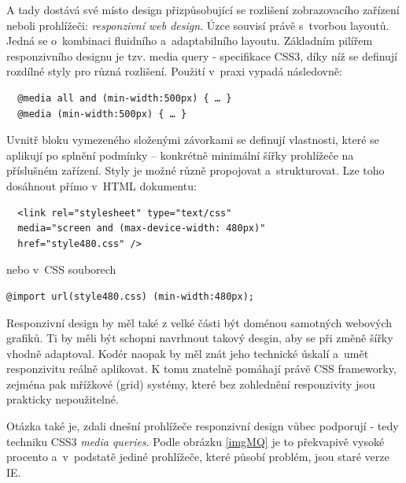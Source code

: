 \documentclass[thesis=B,czech]{FITthesis}[2012/06/26]
\begin{document}
A tady dostává své místo design přizpůsobující se rozlišení zobrazovacího zařízení neboli prohlížeči: \textit{responzivní web design}. Úzce souvisí právě s~tvorbou layoutů. Jedná se o~kombinaci fluidního a~adaptabilního layoutu. Základním pilířem responzivního designu je tzv. media query - specifikace CSS3, díky níž se definují rozdílné styly pro různá rozlišení. Použití v~praxi vypadá následovně:
\scriptsize
\begin{verbatim}
  @media all and (min-width:500px) { … }
  @media (min-width:500px) { … }
\end{verbatim}
\normalsize
Uvnitř bloku vymezeného složenými závorkami se definují vlastnosti, které se aplikují po splnění podmínky -- konkrétně minimální šířky prohlížeče na příslušném zařízení. Styly je možné různě propojovat a~strukturovat. Lze toho dosáhnout přímo v~\gls{HTML} dokumentu:
\scriptsize
\begin{verbatim}
  <link rel="stylesheet" type="text/css"
  media="screen and (max-device-width: 480px)"
  href="style480.css" />
\end{verbatim}
\normalsize
nebo v~\gls{CSS} souborech\cite{mq}
\scriptsize
\begin{verbatim}
@import url(style480.css) (min-width:480px);
\end{verbatim}
\normalsize


Responzivní design by měl také z velké části být doménou samotných webových grafiků. Ti by měli být schopni navrhnout takový desgin, aby se při změně šířky vhodně adaptoval. Kodér naopak by měl znát jeho technické úskalí a~umět responzivitu reálně aplikovat. K tomu znatelně pomáhají právě \gls{CSS} frameworky, zejména pak mřížkové (grid) systémy, které bez zohlednění responzivity jsou prakticky nepoužitelné\cite{dev}\cite{dev2}.

Otázka také je, zdali dnešní prohlížeče responzivní design vůbec podporují - tedy techniku CSS3 \textit{media queries}. Podle obrázku \ref{imgMQ} je to překvapivě vysoké procento a~v~podstatě jediné prohlížeče, které působí problém, jsou staré verze \gls{IE}\cite{mqsup}. 
\end{document}
